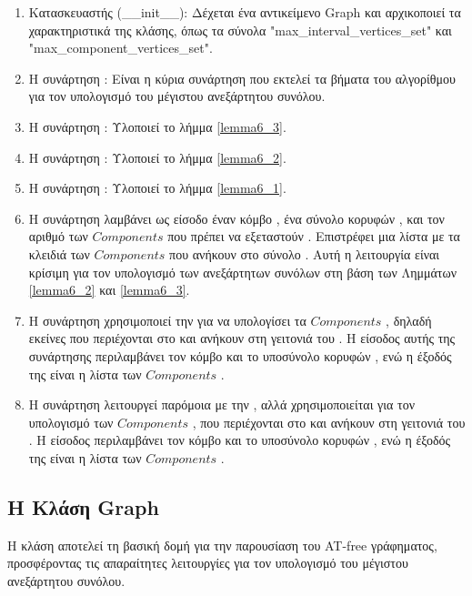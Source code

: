 \begin{enumerate}
	\item Κατασκευαστής (\_\_init\_\_): Δέχεται ένα αντικείμενο  Graph και αρχικοποιεί τα χαρακτηριστικά της κλάσης, όπως τα σύνολα "max\_interval\_vertices\_set" και "max\_component\_vertices\_set".
	\item H συνάρτηση : Είναι η κύρια συνάρτηση που εκτελεί τα βήματα του αλγορίθμου για τον υπολογισμό του μέγιστου ανεξάρτητου συνόλου.
	\item Η συνάρτηση : Υλοποιεί το λήμμα \ref{lemma6_3}.
	\item H συνάρτηση : Υλοποιεί το λήμμα \ref{lemma6_2}.
	\item H συνάρτηση : Υλοποιεί το λήμμα \ref{lemma6_1}.
	\item Η συνάρτηση  λαμβάνει ως είσοδο έναν κόμβο , ένα σύνολο κορυφών , και τον αριθμό των $Components$ που πρέπει να εξεταστούν . Επιστρέφει μια λίστα με τα κλειδιά των $Components$ που ανήκουν στο σύνολο . Αυτή η λειτουργία είναι κρίσιμη για τον υπολογισμό των ανεξάρτητων συνόλων στη βάση των Λημμάτων \ref{lemma6_2} και \ref{lemma6_3}.
	\item Η συνάρτηση  χρησιμοποιεί την  για να υπολογίσει τα $Components$ , δηλαδή εκείνες που περιέχονται στο  και ανήκουν στη γειτονιά του . Η είσοδος αυτής της συνάρτησης περιλαμβάνει τον κόμβο  και το υποσύνολο κορυφών , ενώ η έξοδός της είναι η λίστα των $Components$ .
	\item Η συνάρτηση  λειτουργεί παρόμοια με την , αλλά χρησιμοποιείται για τον υπολογισμό των $Components$ , που περιέχονται στο  και ανήκουν στη γειτονιά του . Η είσοδος περιλαμβάνει τον κόμβο  και το υποσύνολο κορυφών , ενώ η έξοδός της είναι η λίστα των $Components$ .
\end{enumerate}

\subsection{H Kλάση Graph}

Η κλάση  αποτελεί τη βασική δομή για την παρουσίαση του AT-free γράφηματος, προσφέροντας τις απαραίτητες λειτουργίες για τον υπολογισμό του μέγιστου ανεξάρτητου συνόλου.

